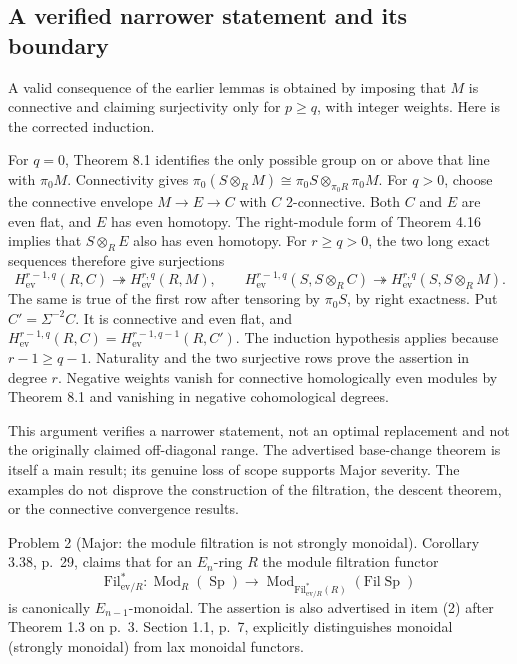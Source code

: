 \documentclass[10pt]{article}
\begin{document}
\subsection*{A verified narrower statement and its boundary}
A valid consequence of the earlier lemmas is obtained by imposing that \(M\) is connective and claiming surjectivity only for \(p\ge q\), with integer weights. Here is the corrected induction.\par
For \(q=0\), Theorem 8.1 identifies the only possible group on or above that line with \(\pi_0M\). Connectivity gives \(\pi_0(S\otimes_R M)\cong\pi_0S\otimes_{\pi_0R}\pi_0M\). For \(q>0\), choose the connective envelope \(M\to E\to C\) with \(C\) 2-connective. Both \(C\) and \(E\) are even flat, and \(E\) has even homotopy. The right-module form of Theorem 4.16 implies that \(S\otimes_R E\) also has even homotopy. For \(r\ge q>0\), the two long exact sequences therefore give surjections \[H_{\mathrm{ev}}^{r-1,q}(R,C)\twoheadrightarrow H_{\mathrm{ev}}^{r,q}(R,M),
 \qquad
 H_{\mathrm{ev}}^{r-1,q}(S,S\otimes_R C)
 \twoheadrightarrow H_{\mathrm{ev}}^{r,q}(S,S\otimes_R M).\] The same is true of the first row after tensoring by \(\pi_0S\), by right exactness. Put \(C'=\Sigma^{-2}C\). It is connective and even flat, and \(H_{\mathrm{ev}}^{r-1,q}(R,C)=H_{\mathrm{ev}}^{r-1,q-1}(R,C')\). The induction hypothesis applies because \(r-1\ge q-1\). Naturality and the two surjective rows prove the assertion in degree \(r\). Negative weights vanish for connective homologically even modules by Theorem 8.1 and vanishing in negative cohomological degrees.\par
This argument verifies a narrower statement, not an optimal replacement and not the originally claimed off-diagonal range. The advertised base-change theorem is itself a main result; its genuine loss of scope supports Major severity. The examples do not disprove the construction of the filtration, the descent theorem, or the connective convergence results.\par
Problem 2 (Major: the module filtration is not strongly monoidal).  Corollary 3.38, p. 29, claims that for an \(E_n\)-ring \(R\) the module filtration functor \[\mathrm{Fil}_{\mathrm{ev}/R}^{*}:\operatorname{Mod}_R(\operatorname{Sp})
 \longrightarrow
 \operatorname{Mod}_{\mathrm{Fil}_{\mathrm{ev}/R}^{*}(R)}(\mathrm{Fil}\operatorname{Sp})\] is canonically \(E_{n-1}\)-monoidal. The assertion is also advertised in item (2) after Theorem 1.3 on p. 3. Section 1.1, p. 7, explicitly distinguishes monoidal (strongly monoidal) from lax monoidal functors.\par
\end{document}
